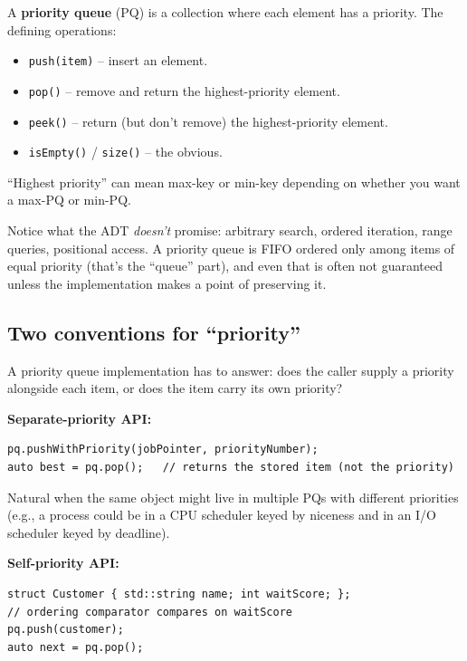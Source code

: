 \documentclass[11pt]{article}
\begin{document}
\begin{defnbox}
A \textbf{priority queue} (PQ) is a collection where each element has a priority. The defining operations:
\begin{itemize}[leftmargin=*]
    \item \texttt{push(item)} -- insert an element.
    \item \texttt{pop()} -- remove and return the highest-priority element.
    \item \texttt{peek()} -- return (but don't remove) the highest-priority element.
    \item \texttt{isEmpty()} / \texttt{size()} -- the obvious.
\end{itemize}
``Highest priority'' can mean max-key or min-key depending on whether you want a max-PQ or min-PQ.
\end{defnbox}

Notice what the ADT \emph{doesn't} promise: arbitrary search, ordered iteration, range queries, positional access. A priority queue is FIFO ordered only among items of equal priority (that's the ``queue'' part), and even that is often not guaranteed unless the implementation makes a point of preserving it.

\subsection*{Two conventions for ``priority''}

A priority queue implementation has to answer: does the caller supply a priority alongside each item, or does the item carry its own priority?

\textbf{Separate-priority API:}

\begin{lstlisting}
pq.pushWithPriority(jobPointer, priorityNumber);
auto best = pq.pop();   // returns the stored item (not the priority)
\end{lstlisting}

Natural when the same object might live in multiple PQs with different priorities (e.g., a process could be in a CPU scheduler keyed by niceness and in an I/O scheduler keyed by deadline).

\textbf{Self-priority API:}

\begin{lstlisting}
struct Customer { std::string name; int waitScore; };
// ordering comparator compares on waitScore
pq.push(customer);
auto next = pq.pop();
\end{lstlisting}
\end{document}
